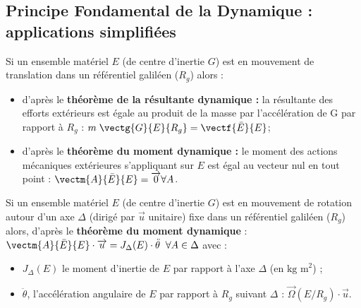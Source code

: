 \subsection[PFD : applications simplifiées]{Principe Fondamental de la Dynamique : applications simplifiées}


\begin{defi}
Si un ensemble matériel $E$ (de centre d'inertie $G$) est en mouvement de translation dans un référentiel galiléen ($R_g$) alors : 

\begin{itemize}
\item d'après le \textbf{théorème de la résultante dynamique : } la résultante des efforts extérieurs est égale au produit de la masse par l'accélération de G par rapport à $R_g$ :
$
m\;\vectg{G}{E}{R_g}=\vectf{\bar E}{E}$;%
\item d'après le \textbf{théorème du moment dynamique : } le moment des actions mécaniques extérieures s'appliquant sur $E$ est égal au vecteur nul en tout point :
$\vectm{A}{\bar E}{E}=\overrightarrow{0}\forall  A$.
\end{itemize}

\end{defi}
 



\begin{defi}
Si un ensemble matériel $E$ (de centre d'inertie $G$) est en mouvement de rotation autour d'un axe $\Delta$ (dirigé par $\overrightarrow{u}$ unitaire) fixe dans un référentiel galiléen ($R_g$) alors, d'après le \textbf{théorème du moment dynamique} :
$
\vectm{A}{\bar E}{E}\cdot \overrightarrow{u}=J_{\Delta}(E)\cdot \ddot{\theta}\;\;\forall A\in \Delta
$ avec :
\begin{itemize}
\item  $J_{\Delta}(E)$ le moment d'inertie de $E$ par rapport à l'axe $\Delta$ (en $\text{kg  m}^2$) ;
\item $\ddot{\theta}$, l'accélération angulaire de $E$ par rapport à $R_g$ suivant $\Delta$ : $\overrightarrow{\Omega}(E/R_g)\cdot \overrightarrow{u}$.
\end{itemize}
\end{defi}

